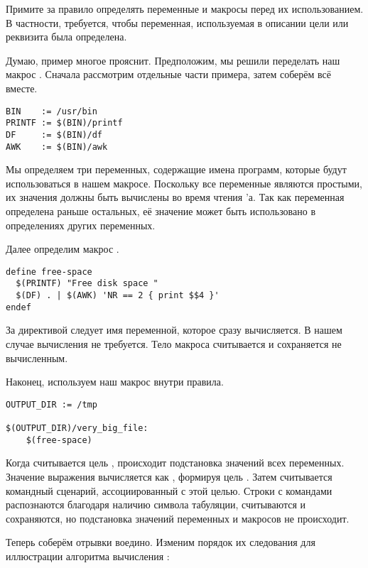 Примите за правило определять переменные и макросы перед их
использованием. В частности, требуется, чтобы переменная,
используемая в описании цели или реквизита была определена.

Думаю, пример многое прояснит. Предположим, мы решили переделать наш
макрос . Сначала рассмотрим отдельные части
примера, затем соберём всё вместе.

{\footnotesize
\begin{verbatim}
BIN    := /usr/bin
PRINTF := $(BIN)/printf
DF     := $(BIN)/df
AWK    := $(BIN)/awk
\end{verbatim}
}

Мы определяем три переменных, содержащие имена программ, которые будут
использоваться в нашем макросе. Поскольку все переменные являются
простыми, их значения должны быть вычислены во время чтения
\Makefile{}'а.  Так как переменная  определена раньше
остальных, её значение может быть использовано в определениях других
переменных.

Далее определим макрос .

{\footnotesize
\begin{verbatim}
define free-space
  $(PRINTF) "Free disk space "
  $(DF) . | $(AWK) 'NR == 2 { print $$4 }'
endef
\end{verbatim}
}

За директивой  следует имя переменной, которое сразу
вычисляется. В нашем случае вычисления не требуется. Тело макроса
считывается и сохраняется не вычисленным.

Наконец, используем наш макрос внутри правила.

{\footnotesize
\begin{verbatim}
OUTPUT_DIR := /tmp

$(OUTPUT_DIR)/very_big_file:
    $(free-space)
\end{verbatim}
}

Когда считывается цель ,
происходит подстановка значений всех переменных. Значение выражения
 вычисляется как , формируя
цель . Затем считывается командный
сценарий, ассоциированный с этой целью. Строки с командами
распознаются благодаря наличию символа табуляции, считываются и
сохраняются, но подстановка значений переменных и макросов не
происходит.

Теперь соберём отрывки воедино. Изменим порядок их следования для
иллюстрации алгоритма вычисления \GNUmake{}:

